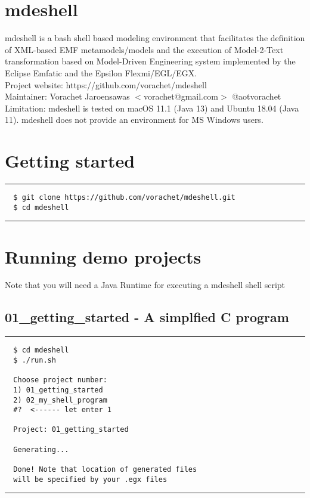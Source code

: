\documentclass[12pt]{article}
\begin{document}

\section*{mdeshell}

mdeshell is a bash shell based modeling environment that facilitates the definition of XML-based EMF metamodels/models and the execution of Model-2-Text transformation based on Model-Driven Engineering system implemented by the Eclipse Emfatic and the Epsilon Flexmi/EGL/EGX.  \\


Project website: https://github.com/vorachet/mdeshell \\
Maintainer: Vorachet Jaroensawas $<$vorachet@gmail.com$>$ @aotvorachet \\

Limitation: mdeshell is tested on macOS 11.1 (Java 13) and Ubuntu 18.04 (Java 11). mdeshell does not provide an environment for MS Windows users. 



\section*{Getting started}
\noindent\rule{8cm}{0.4pt}
\begin{lstlisting}
  $ git clone https://github.com/vorachet/mdeshell.git
  $ cd mdeshell
\end{lstlisting}
\noindent\rule{8cm}{0.4pt}


\section*{Running demo projects}

Note that you will need a Java Runtime for executing a mdeshell shell script 

\subsection*{01\_getting\_started - A simplfied C program}
\noindent\rule{8cm}{0.4pt}
\begin{lstlisting}
  $ cd mdeshell
  $ ./run.sh 

  Choose project number:
  1) 01_getting_started
  2) 02_my_shell_program
  #?  <------ let enter 1

  Project: 01_getting_started 

  Generating...

  Done! Note that location of generated files 
  will be specified by your .egx files
\end{lstlisting}
\noindent\rule{8cm}{0.4pt}
\end{document}
